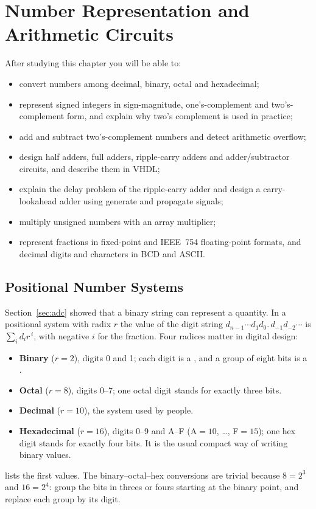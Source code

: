 \chapter{Number Representation and Arithmetic Circuits}\label{ch:arith}

\begin{objectives}
After studying this chapter you will be able to:
\begin{itemize}
  \item convert numbers among decimal, binary, octal and hexadecimal;
  \item represent signed integers in sign-magnitude, one's-complement and two's-complement form, and explain why two's complement is used in practice;
  \item add and subtract two's-complement numbers and detect arithmetic overflow;
  \item design half adders, full adders, ripple-carry adders and adder/subtractor circuits, and describe them in VHDL;
  \item explain the delay problem of the ripple-carry adder and design a carry-lookahead adder using generate and propagate signals;
  \item multiply unsigned numbers with an array multiplier;
  \item represent fractions in fixed-point and IEEE~754 floating-point formats, and decimal digits and characters in BCD and ASCII.
\end{itemize}
\end{objectives}

\section{Positional Number Systems}\label{sec:numsys}
Section~\ref{sec:adc} showed that a binary string can represent a quantity. In a positional system with radix $r$ the value of the digit string $d_{n-1}\cdots d_1d_0.\,d_{-1}d_{-2}\cdots$ is $\sum_i d_i r^{\,i}$, with negative $i$ for the fraction. Four radices matter in digital design:
\begin{itemize}
  \item \textbf{Binary} ($r=2$), digits 0 and 1; each digit is a , and a group of eight bits is a .
  \item \textbf{Octal} ($r=8$), digits 0--7; one octal digit stands for exactly three bits.
  \item \textbf{Decimal} ($r=10$), the system used by people.
  \item \textbf{Hexadecimal} ($r=16$), digits 0--9 and A--F (A$=10$, \dots, F$=15$); one hex digit stands for exactly four bits. It is the usual compact way of writing binary values.
\end{itemize}
 lists the first values. The binary--octal--hex conversions are trivial because $8=2^3$ and $16=2^4$: group the bits in threes or fours starting at the binary point, and replace each group by its digit.

